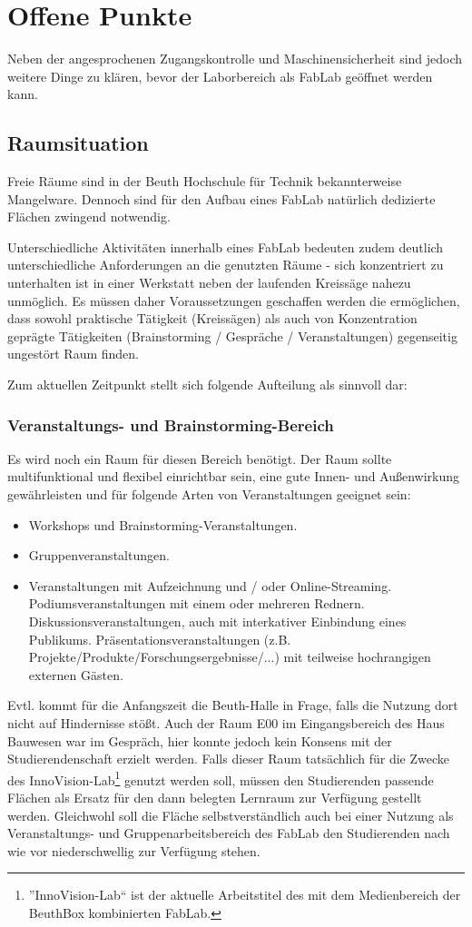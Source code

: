 \documentclass[parskip=half,headsepline,footsepline,titlepage]{scrartcl}
\begin{document}
\section{Offene Punkte}
Neben der angesprochenen Zugangskontrolle und Maschinensicherheit sind jedoch weitere Dinge zu klären, bevor der Laborbereich als FabLab geöffnet werden kann. 

\subsection{Raumsituation}
Freie Räume sind in der Beuth Hochschule für Technik bekannterweise Mangelware. Dennoch sind für den Aufbau eines FabLab natürlich dedizierte Flächen zwingend notwendig.

Unterschiedliche Aktivitäten innerhalb eines FabLab bedeuten zudem deutlich unterschiedliche Anforderungen an die genutzten Räume - sich konzentriert zu unterhalten ist in einer Werkstatt neben der laufenden Kreissäge nahezu unmöglich. Es müssen daher Voraussetzungen geschaffen werden die ermöglichen, dass sowohl praktische Tätigkeit (Kreissägen) als auch von Konzentration geprägte Tätigkeiten (Brainstorming / Gespräche / Veranstaltungen) gegenseitig ungestört Raum finden. 

Zum aktuellen Zeitpunkt stellt sich folgende Aufteilung als sinnvoll dar:
\subsubsection{Veranstaltungs- und Brainstorming-Bereich}
Es wird noch ein Raum für diesen Bereich benötigt. Der Raum sollte multifunktional und flexibel einrichtbar sein, eine gute Innen- und Außenwirkung gewährleisten und für folgende Arten von Veranstaltungen geeignet sein:
\begin{itemize}
 \item Workshops und Brainstorming-Veranstaltungen.
 \item Gruppenveranstaltungen.
 \item Veranstaltungen mit Aufzeichnung und / oder Online-Streaming.
 \subitem Podiumsveranstaltungen mit einem oder mehreren Rednern.
 \subitem Diskussionsveranstaltungen, auch mit interkativer Einbindung eines Publikums.
 \subitem Präsentationsveranstaltungen (z.B. Projekte/Produkte/Forschungsergebnisse/...) mit teilweise hochrangigen externen Gästen.
\end{itemize}
Evtl. kommt für die Anfangszeit die Beuth-Halle in Frage, falls die Nutzung dort nicht auf Hindernisse stößt. Auch der Raum E00 im Eingangsbereich des Haus Bauwesen war im Gespräch, hier konnte jedoch kein Konsens mit der Studierendenschaft erzielt werden. Falls dieser Raum tatsächlich für die Zwecke des InnoVision-Lab\footnote{''InnoVision-Lab`` ist der aktuelle Arbeitstitel des mit dem Medienbereich der BeuthBox kombinierten FabLab.} genutzt werden soll, müssen den Studierenden passende Flächen als Ersatz für den dann belegten Lernraum zur Verfügung gestellt werden. Gleichwohl soll die Fläche selbstverständlich auch bei einer Nutzung als Veranstaltungs- und Gruppenarbeitsbereich des FabLab den Studierenden nach wie vor niederschwellig zur Verfügung stehen.
\end{document}
